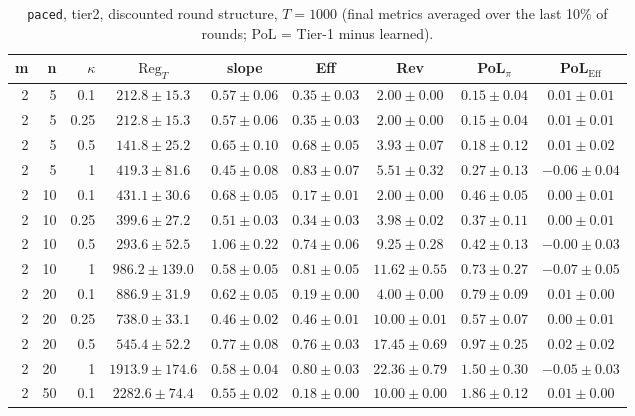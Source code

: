 \begin{table}[htbp]
\centering
\scriptsize
\caption{\texttt{paced}, tier2, discounted round structure, $T=1000$ (final metrics averaged over the last 10\% of rounds; PoL = Tier-1 minus learned).}
\label{tab:tier2_paced_discounted}
\begin{tabular}{@{}rrrcccccc@{}}
\toprule
m & n & $\kappa$ & $\mathrm{Reg}_T$ & slope & Eff & Rev & PoL$_\pi$ & PoL$_\mathrm{Eff}$ \\
\midrule
2 & 5 & 0.1 & $212.8 \pm 15.3$ & $0.57 \pm 0.06$ & $0.35 \pm 0.03$ & $2.00 \pm 0.00$ & $0.15 \pm 0.04$ & $0.01 \pm 0.01$ \\
2 & 5 & 0.25 & $212.8 \pm 15.3$ & $0.57 \pm 0.06$ & $0.35 \pm 0.03$ & $2.00 \pm 0.00$ & $0.15 \pm 0.04$ & $0.01 \pm 0.01$ \\
2 & 5 & 0.5 & $141.8 \pm 25.2$ & $0.65 \pm 0.10$ & $0.68 \pm 0.05$ & $3.93 \pm 0.07$ & $0.18 \pm 0.12$ & $0.01 \pm 0.02$ \\
2 & 5 & 1 & $419.3 \pm 81.6$ & $0.45 \pm 0.08$ & $0.83 \pm 0.07$ & $5.51 \pm 0.32$ & $0.27 \pm 0.13$ & $-0.06 \pm 0.04$ \\
2 & 10 & 0.1 & $431.1 \pm 30.6$ & $0.68 \pm 0.05$ & $0.17 \pm 0.01$ & $2.00 \pm 0.00$ & $0.46 \pm 0.05$ & $0.00 \pm 0.01$ \\
2 & 10 & 0.25 & $399.6 \pm 27.2$ & $0.51 \pm 0.03$ & $0.34 \pm 0.03$ & $3.98 \pm 0.02$ & $0.37 \pm 0.11$ & $0.00 \pm 0.01$ \\
2 & 10 & 0.5 & $293.6 \pm 52.5$ & $1.06 \pm 0.22$ & $0.74 \pm 0.06$ & $9.25 \pm 0.28$ & $0.42 \pm 0.13$ & $-0.00 \pm 0.03$ \\
2 & 10 & 1 & $986.2 \pm 139.0$ & $0.58 \pm 0.05$ & $0.81 \pm 0.05$ & $11.62 \pm 0.55$ & $0.73 \pm 0.27$ & $-0.07 \pm 0.05$ \\
2 & 20 & 0.1 & $886.9 \pm 31.9$ & $0.62 \pm 0.05$ & $0.19 \pm 0.00$ & $4.00 \pm 0.00$ & $0.79 \pm 0.09$ & $0.01 \pm 0.00$ \\
2 & 20 & 0.25 & $738.0 \pm 33.1$ & $0.46 \pm 0.02$ & $0.46 \pm 0.01$ & $10.00 \pm 0.01$ & $0.57 \pm 0.07$ & $0.00 \pm 0.01$ \\
2 & 20 & 0.5 & $545.4 \pm 52.2$ & $0.77 \pm 0.08$ & $0.76 \pm 0.03$ & $17.45 \pm 0.69$ & $0.97 \pm 0.25$ & $0.02 \pm 0.02$ \\
2 & 20 & 1 & $1913.9 \pm 174.6$ & $0.58 \pm 0.04$ & $0.80 \pm 0.03$ & $22.36 \pm 0.79$ & $1.50 \pm 0.30$ & $-0.05 \pm 0.03$ \\
2 & 50 & 0.1 & $2282.6 \pm 74.4$ & $0.55 \pm 0.02$ & $0.18 \pm 0.00$ & $10.00 \pm 0.00$ & $1.86 \pm 0.12$ & $0.01 \pm 0.00$ \\

\end{tabular}
\end{table}
